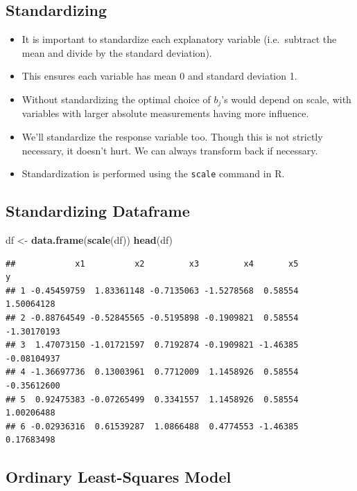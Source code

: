 \documentclass[]{book}
\newenvironment{Shaded}{\begin{snugshade}}{\end{snugshade}}
\newcommand{\KeywordTok}[1]{\textcolor[rgb]{0.13,0.29,0.53}{\textbf{#1}}}
\newcommand{\StringTok}[1]{\textcolor[rgb]{0.31,0.60,0.02}{#1}}
\newcommand{\NormalTok}[1]{#1}
\begin{document}
\subsection{Standardizing}\label{standardizing}

\begin{itemize}
\item
  It is important to standardize each explanatory variable
  (i.e.~subtract the mean and divide by the standard deviation).
\item
  This ensures each variable has mean 0 and standard deviation 1.
\item
  Without standardizing the optimal choice of \(b_j\)'s would depend on
  scale, with variables with larger absolute measurements having more
  influence.
\item
  We'll standardize the response variable too. Though this is not
  strictly necessary, it doesn't hurt. We can always transform back if
  necessary.
\item
  Standardization is performed using the \texttt{scale} command in R.
\end{itemize}

\subsection{Standardizing Dataframe}\label{standardizing-dataframe}

\begin{Shaded}
\begin{Highlighting}[]
\NormalTok{df <-}\StringTok{ }\KeywordTok{data.frame}\NormalTok{(}\KeywordTok{scale}\NormalTok{(df))}
\KeywordTok{head}\NormalTok{(df)}
\end{Highlighting}
\end{Shaded}

\begin{verbatim}
##            x1          x2         x3         x4       x5           y
## 1 -0.45459759  1.83361148 -0.7135063 -1.5278568  0.58554  1.50064128
## 2 -0.88764549 -0.52845565 -0.5195898 -0.1909821  0.58554 -1.30170193
## 3  1.47073150 -1.01721597  0.7192874 -0.1909821 -1.46385 -0.08104937
## 4 -1.36697736  0.13003961  0.7712009  1.1458926  0.58554 -0.35612600
## 5  0.92475383 -0.07265499  0.3341557  1.1458926  0.58554  1.00206488
## 6 -0.02936316  0.61539287  1.0866488  0.4774553 -1.46385  0.17683498
\end{verbatim}

\subsection{Ordinary Least-Squares
Model}\label{ordinary-least-squares-model}
\end{document}
